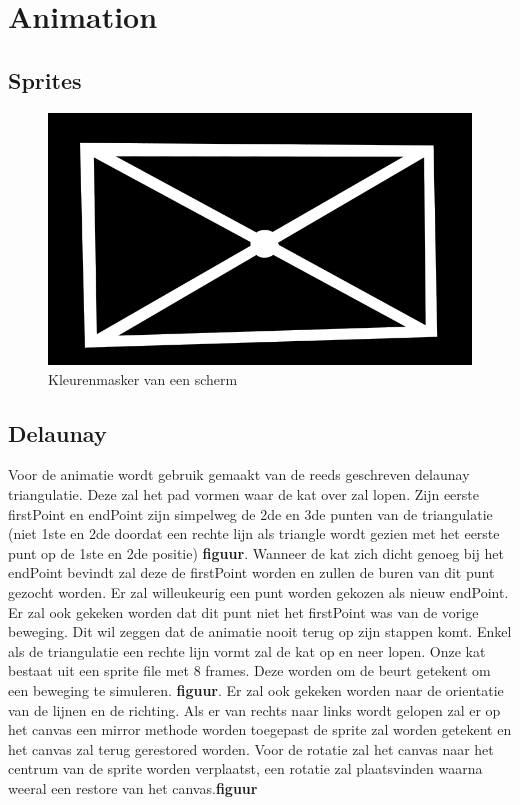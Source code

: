 \section{Animation}


\subsection{Sprites}

\begin{figure}[h]
\centering
\includegraphics[scale=0.6]{img/mask.png}
\caption{Kleurenmasker van een scherm}
\end{figure}




\subsection{Delaunay}

Voor de animatie wordt gebruik gemaakt van de reeds geschreven delaunay triangulatie. Deze zal het pad vormen waar de kat over zal lopen. Zijn eerste firstPoint en endPoint zijn simpelweg de 2de en 3de punten van de triangulatie (niet 1ste en 2de doordat een rechte lijn als triangle wordt gezien met het eerste punt op de 1ste en 2de positie) \textbf{figuur}. Wanneer de kat zich dicht genoeg bij het endPoint bevindt zal deze de firstPoint worden en zullen de buren van dit punt gezocht worden. Er zal willeukeurig een punt worden gekozen als nieuw endPoint. Er zal ook gekeken worden dat dit punt niet het firstPoint was van de vorige beweging. Dit wil zeggen dat de animatie nooit terug op zijn stappen komt. Enkel als de triangulatie een rechte lijn vormt zal de kat op en neer lopen. Onze kat bestaat uit een sprite file met 8 frames. Deze worden om de beurt getekent om een beweging te simuleren. \textbf{figuur}. Er zal ook gekeken worden naar de orientatie van de lijnen en de richting. Als er van rechts naar links wordt gelopen zal er op het canvas een mirror methode worden toegepast de sprite zal worden getekent en het canvas zal terug gerestored worden. Voor de rotatie zal het canvas naar het centrum van de sprite worden verplaatst, een rotatie zal plaatsvinden waarna weeral een restore van het canvas.\textbf{figuur}

